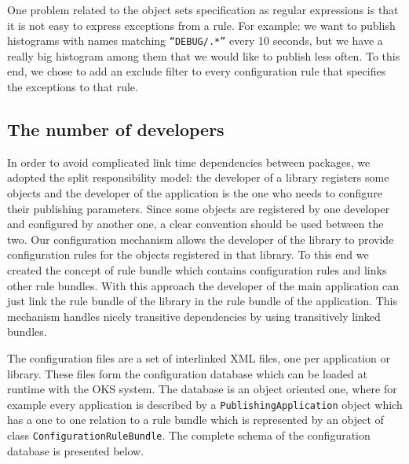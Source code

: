 One problem related to the object sets specification as regular expressions is that it is not easy to express exceptions from a rule. For example: we want to publish histograms with names matching {\tt “DEBUG/.*”} every 10 seconds, but we have a really big histogram among them that we would like to publish less often. To this end, we chose to add an exclude filter to every configuration rule that specifies the exceptions to that rule.

\subsection*{The number of developers}

In order to avoid complicated link time dependencies between packages, we adopted the split responsibility model: the developer of a library registers some objects and the developer of the application is the one who needs to configure their publishing parameters. Since some objects are registered by one developer and configured by another one, a clear convention should be used between the two. 
Our configuration mechanism allows the developer of the library to provide configuration rules for the objects registered in that library. To this end we created the concept of rule bundle which contains configuration rules and links other rule bundles. With this approach the developer of the main application can just link the rule bundle of the library in the rule bundle of the application. This mechanism handles nicely transitive dependencies by using transitively linked bundles.

The configuration files are a set of interlinked XML files, one per application or library. These files form the configuration database which can be loaded at runtime with the OKS system. The database is an object oriented one, where for example every application is described by a {\tt PublishingApplication} object which has a one to one relation to a rule bundle which is represented by an object of class {\tt ConfigurationRuleBundle}. The complete schema of the configuration database is presented below. 

